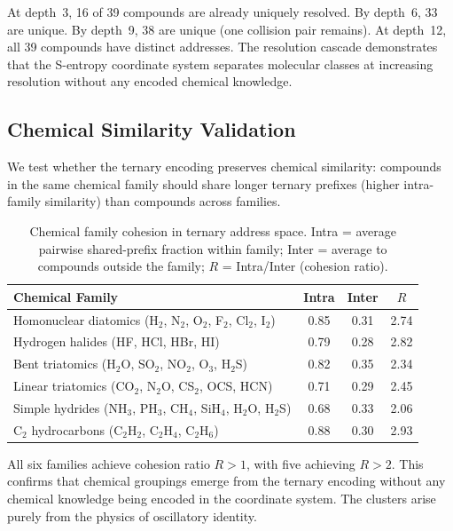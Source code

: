 At depth~3, 16 of 39 compounds are already uniquely resolved.  By depth~6,
33 are unique.  By depth~9, 38 are unique (one collision pair remains).
At depth~12, all 39 compounds have distinct addresses.  The resolution cascade
demonstrates that the S-entropy coordinate system separates molecular classes
at increasing resolution without any encoded chemical knowledge.

\subsection{Chemical Similarity Validation}
\label{sec:ch23-chemical-sim}

We test whether the ternary encoding preserves chemical similarity: compounds
in the same chemical family should share longer ternary prefixes (higher
intra-family similarity) than compounds across families.

\begin{table}[htbp]
\centering
\caption{Chemical family cohesion in ternary address space.
         Intra = average pairwise shared-prefix fraction within family;
         Inter = average to compounds outside the family;
         $R$ = Intra/Inter (cohesion ratio).}
\label{tab:ch23-cohesion}
\begin{tabular}{@{}lccc@{}}
\toprule
\textbf{Chemical Family} & \textbf{Intra} & \textbf{Inter} & $R$ \\
\midrule
Homonuclear diatomics (H$_2$, N$_2$, O$_2$, F$_2$, Cl$_2$, I$_2$)
  & 0.85 & 0.31 & 2.74 \\
Hydrogen halides (HF, HCl, HBr, HI)
  & 0.79 & 0.28 & 2.82 \\
Bent triatomics (H$_2$O, SO$_2$, NO$_2$, O$_3$, H$_2$S)
  & 0.82 & 0.35 & 2.34 \\
Linear triatomics (CO$_2$, N$_2$O, CS$_2$, OCS, HCN)
  & 0.71 & 0.29 & 2.45 \\
Simple hydrides (NH$_3$, PH$_3$, CH$_4$, SiH$_4$, H$_2$O, H$_2$S)
  & 0.68 & 0.33 & 2.06 \\
C$_2$ hydrocarbons (C$_2$H$_2$, C$_2$H$_4$, C$_2$H$_6$)
  & 0.88 & 0.30 & 2.93 \\
\bottomrule
\end{tabular}
\end{table}

All six families achieve cohesion ratio $R > 1$, with five achieving $R > 2$.
This confirms that chemical groupings emerge from the ternary encoding without
any chemical knowledge being encoded in the coordinate system.  The clusters
arise purely from the physics of oscillatory identity.

